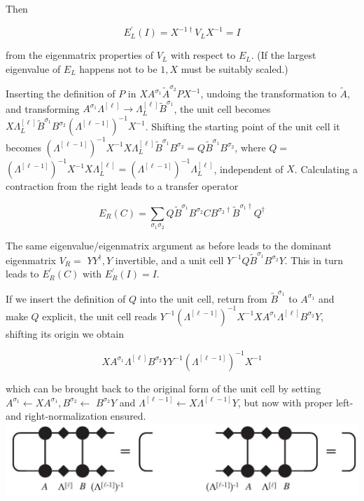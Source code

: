 \documentclass[12pt]{article}
\begin{document}
Then


\begin{equation*}
E_{L}^{\prime}(I)=X^{-1 \dagger} V_{L} X^{-1}=I \tag{355}
\end{equation*}


from the eigenmatrix properties of $V_{L}$ with respect to $E_{L}$. (If the largest eigenvalue of $E_{L}$ happens not to be $1, X$ must be suitably scaled.)

Inserting the definition of $P$ in $X A^{\sigma_{1}} \tilde{A}^{\sigma_{2}} P X^{-1}$, undoing the transformation to $\tilde{A}$, and transforming $A^{\sigma_{1}} \Lambda^{[\ell]} \rightarrow \Lambda_{L}^{[\ell]} \tilde{B}^{\sigma_{1}}$, the unit cell becomes $X \Lambda_{L}^{[\ell]} \tilde{B}^{\sigma_{1}} B^{\sigma_{2}}\left(\Lambda^{[\ell-1]}\right)^{-1} X^{-1}$. Shifting the starting point of the unit cell it becomes $\left(\Lambda^{[\ell-1]}\right)^{-1} X^{-1} X \Lambda_{L}^{[\ell]} \tilde{B}^{\sigma_{1}} B^{\sigma_{2}}=Q \tilde{B}^{\sigma_{1}} B^{\sigma_{2}}$, where $Q=$ $\left(\Lambda^{[\ell-1]}\right)^{-1} X^{-1} X \Lambda_{L}^{[\ell]}=\left(\Lambda^{[\ell-1]}\right)^{-1} \Lambda_{L}^{[\ell]}$, independent of $X$. Calculating a contraction from the right leads to a transfer operator


\begin{equation*}
E_{R}(C)=\sum_{\sigma_{1} \sigma_{2}} Q \tilde{B}^{\sigma_{1}} B^{\sigma_{2}} C B^{\sigma_{2} \dagger} \tilde{B}^{\sigma_{1} \dagger} Q^{\dagger} \tag{356}
\end{equation*}


The same eigenvalue/eigenmatrix argument as before leads to the dominant eigenmatrix $V_{R}=$ $Y Y^{\dagger}, Y$ invertible, and a unit cell $Y^{-1} Q \tilde{B}^{\sigma_{1}} B^{\sigma_{2}} Y$. This in turn leads to $E_{R}^{\prime}(C)$ with $E_{R}^{\prime}(I)=I$.

If we insert the definition of $Q$ into the unit cell, return from $\tilde{B}^{\sigma_{1}}$ to $A^{\sigma_{1}}$ and make $Q$ explicit, the unit cell reads $Y^{-1}\left(\Lambda^{[\ell-1]}\right)^{-1} X^{-1} X A^{\sigma_{1}} \Lambda^{[\ell]} B^{\sigma_{2}} Y$, shifting its origin we obtain


\begin{equation*}
X A^{\sigma_{1}} \Lambda^{[\ell]} B^{\sigma_{2}} Y Y^{-1}\left(\Lambda^{[\ell-1]}\right)^{-1} X^{-1} \tag{357}
\end{equation*}


which can be brought back to the original form of the unit cell by setting $A^{\sigma_{1}} \leftarrow X A^{\sigma_{1}}, B^{\sigma_{2}} \leftarrow$ $B^{\sigma_{2}} Y$ and $\Lambda^{[\ell-1]} \leftarrow X \Lambda^{[\ell-1]} Y$, but now with proper left- and right-normalization ensured.\\
\includegraphics[max width=\textwidth, center]{2024_05_04_afc4ad226da9ccfe0ac8g-113}
\end{document}

